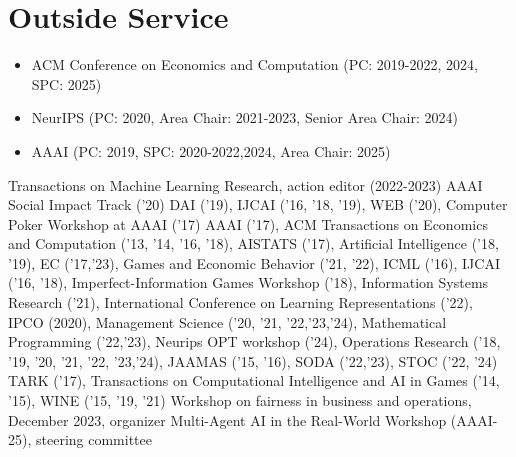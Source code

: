 \documentclass[11pt,a4paper,sans]{moderncv}        %
\begin{document}
\section{Outside Service}
{
  \begin{itemize}
    \item ACM Conference on Economics and Computation (PC: 2019-2022, 2024, SPC: 2025)
    \item NeurIPS (PC: 2020, Area Chair: 2021-2023, Senior Area Chair: 2024)
    \item AAAI (PC: 2019, SPC: 2020-2022,2024, Area Chair: 2025)
  \end{itemize}
}
{
  Transactions on Machine Learning Research, action editor (2022-2023)
}
{
  AAAI Social Impact Track ('20)
}
{
  DAI ('19),
  IJCAI ('16, '18, '19),
  WEB ('20),
  Computer Poker Workshop at AAAI ('17)
}
{
  AAAI ('17),
  ACM Transactions on Economics and Computation ('13, '14, '16, '18),
  AISTATS ('17),
  Artificial Intelligence ('18, '19),
  EC ('17,'23),
  Games and Economic Behavior ('21, '22),
  ICML ('16),
  IJCAI ('16, '18),
  Imperfect-Information Games Workshop ('18),
  Information Systems Research ('21),
  International Conference on Learning Representations ('22),
  IPCO (2020),
  Management Science ('20, '21, '22,'23,'24),
  Mathematical Programming ('22,'23),
  Neurips OPT workshop ('24),
  Operations Research ('18, '19, '20, '21, '22, '23,'24),
  JAAMAS ('15, '16),
  SODA ('22,'23),
  STOC ('22, '24)
  TARK ('17),
  Transactions on Computational Intelligence and AI in Games ('14, '15),
  WINE ('15, '19, '21)
}
{
  Workshop on fairness in business and operations, December 2023, organizer
  Multi-Agent AI in the Real-World Workshop (AAAI-25), steering committee
}
\end{document}
